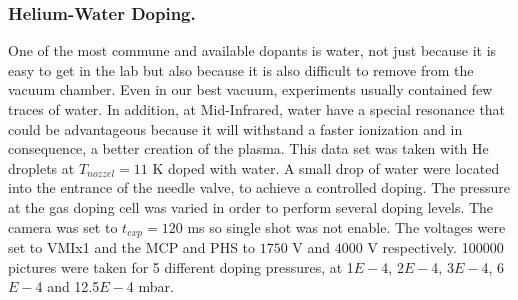\subsubsection{Helium-Water Doping.}

One of the most commune and available dopants is water, not just because it is easy to get in the lab but also because it is also difficult to remove from the vacuum chamber. Even in our best vacuum, experiments usually contained few traces of water. In addition, at Mid-Infrared, water have a special resonance that could be advantageous because it will withstand a faster ionization and in consequence, a better creation of the plasma. This data set was taken with He droplets at $T_{nozzel}=11$ K doped with water. A small drop of water were located into the entrance of the needle valve, to achieve a controlled doping. The pressure at the gas doping cell was varied in order to perform several doping levels. The camera was set to $t_{exp}=120$ ms so single shot was not enable. The voltages were set to VMIx1 and the MCP and PHS to $1750$ V and $4000$ V respectively. 100000 pictures were taken for 5 different doping pressures, at 1$E-$4, 2$E-$4, 3$E-$4, 6$E-$4 and 12.5$E-$4 mbar. 

